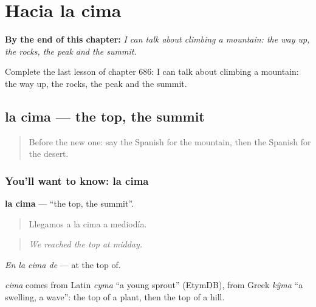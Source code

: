 
\chapter{Hacia la cima}
\label{ch:es-hacia-la-cima}

\begin{chapteropening}
\textbf{By the end of this chapter:} \emph{I can talk about climbing a mountain: the way up, the rocks, the peak and the summit.}

Complete the last lesson of chapter 686: I can talk about climbing a mountain: the way up, the rocks, the peak and the summit.
\end{chapteropening}

\section[la cima]{la cima — the top, the summit}

\label{lesson:ES-C686-cima}



\begin{quote}
Before the new one: say the Spanish for the mountain, then the Spanish for the desert.
\end{quote}

\subsection*{You'll want to know: la cima}
\textbf{la cima} — \textquotedblleft{}the top, the summit\textquotedblright{}.

\begin{quote}
Llegamos a la cima a mediodía.
\end{quote}

\begin{quote}
\emph{We reached the top at midday.}
\end{quote}

\emph{En la cima de} — at the top of.

\begin{cousinweb}
\emph{cima} comes from Latin \emph{cyma} \textquotedblleft{}a young sprout\textquotedblright{} (EtymDB), from Greek \emph{kŷma} \textquotedblleft{}a swelling, a wave\textquotedblright{}: the top of a plant, then the top of a hill.
\end{cousinweb}


